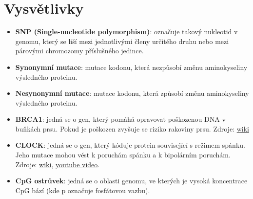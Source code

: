 \documentclass[11pt]{article}
\begin{document}
\section{Vysvětlivky}
\label{sec:orgd6de9e8}
\begin{itemize}
\item \textbf{SNP (Single-nucleotide polymorphism)}: označuje takový nukleotid v genomu,
který se liší mezi jednotlivými členy určitého druhu nebo mezi párovými
chromozomy příslušného jedince.
\item \textbf{Synonymní mutace}: mutace kodonu, která nezpůsobí změnu aminokyseliny
výsledného proteinu.
\item \textbf{Nesynonymní mutace}: mutace kodonu, která způsobí změnu aminokyseliny
výsledného proteinu.
\item \textbf{BRCA1}: jedná se o gen, který pomáhá opravovat poškozenou DNA v buňkách
prsu. Pokud je poškozen zvyšuje se riziko rakoviny prsu.  Zdroje: \href{http://en.wikipedia.org/wiki/BRCA1}{wiki}
\item \textbf{CLOCK}: jedná se o gen, který kóduje protein související s režimem spánku. Jeho
mutace mohou vést k poruchám spánku a k bipolárním poruchám. Zdroje: \href{http://en.wikipedia.org/wiki/CLOCK}{wiki},
\href{http://www.youtube.com/watch?v=XzcdZ-MAyus}{youtube video}.
\item \textbf{CpG ostrůvek}: jedná se o oblasti genomu, ve kterých je vysoká koncentrace CpG
bází (kde p označuje fosfátovou vazbu).
\end{itemize}
\end{document}
